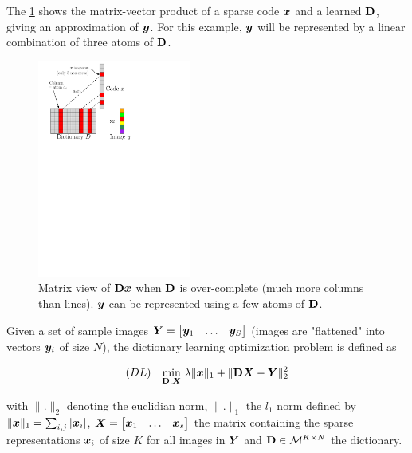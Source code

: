 The \cref{fig_overcomplete_matrix} shows the matrix-vector product of a sparse code $\bm x$ and a learned $\mathbf D$, giving an approximation of $\bm{y}$. For this example, $\bm{y}$ will be represented by a linear combination of three atoms of $\mathbf D$.


\begin{figure}[!ht] \centering
\includegraphics[width=0.45\textwidth]{figures/sparsity-matrix.pdf}
\caption{Matrix view of $\mathbf D\bm x$ when $\mathbf D$ is over-complete (much more columns than lines). $\bm{y}$ can be represented using a few atoms of $\mathbf D$.} \label{fig_overcomplete_matrix}
\end{figure}


Given a set of sample images $\displaystyle \bm{Y} = \begin{bmatrix} \bm{y}_1 & \dots & \bm{y}_S \end{bmatrix}$ (images are "flattened" into vectors $\bm{y}_i$ of size $N$), the dictionary learning optimization problem is defined as

\begin{align}\label{eq_dict_learn}
	 (DL) && \underset{\mathbf D,\bm X}{\min}~ \lambda \lVert \bm x \rVert_1 + \lVert \mathbf D\bm X - \bm{Y} \rVert^2_2
\end{align} 

with $\lVert . \rVert_2$ denoting the euclidian norm, $\lVert . \rVert_1$ the $l_1$ norm defined by $\lVert \bm x \rVert_1 = \sum_{i,j} |\bm x_i|$, $\bm X = \begin{bmatrix} \bm x_1 & \dots & \bm x_s \end{bmatrix}$ the matrix containing the sparse representations $\bm x_i$ of size $K$ for all images in $\bm{Y}$ and $\mathbf D \in \mathcal{M}^{K \times N}$ the dictionary.

